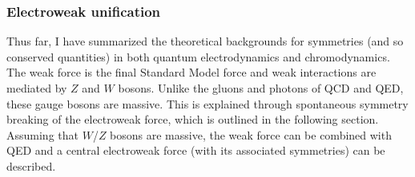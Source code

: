 \subsubsection{Electroweak unification}
Thus far, I have summarized the theoretical backgrounds for symmetries (and so conserved quantities) in both quantum electrodynamics and chromodynamics. The weak force is the final Standard Model force and weak interactions are mediated by $Z$ and $W$ bosons. Unlike the gluons and photons of QCD and QED, these gauge bosons are massive. This is explained through spontaneous symmetry breaking of the electroweak force, which is outlined in the following section. Assuming that $W$/$Z$ bosons are massive, the weak force can be combined with QED and a central electroweak force (with its associated symmetries) can be described. 

